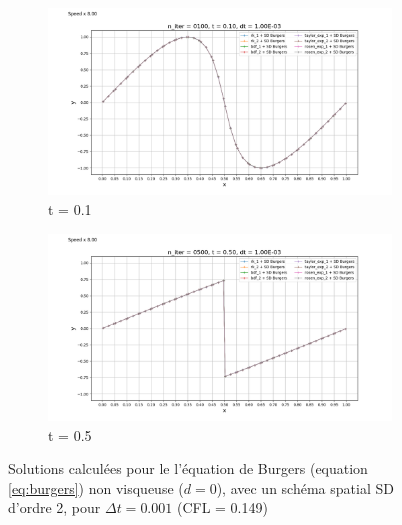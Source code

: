         \begin{figure}
            \centering
            \begin{subfigure}{.5\textwidth}
                \centering
                \includegraphics[width=\textwidth]{images/resultats/edp_burgers_1.png}
                \caption{t = 0.1}
                \label{fig:edp_burgers_1}
            \end{subfigure}%
            \begin{subfigure}{.5\textwidth}
                \centering
                \includegraphics[width=\textwidth]{images/resultats/edp_burgers_2.png}
                \caption{t = 0.5}
                \label{fig:edp_burgers_2}
            \end{subfigure}
            \caption{Solutions calculées pour le l'équation de Burgers (equation \ref{eq:burgers}) non visqueuse ($d = 0$), avec un schéma spatial SD d'ordre 2, pour $\Delta t = 0.001$ (CFL = 0.149)}
            \label{fig:edp_burgers}
        \end{figure}

